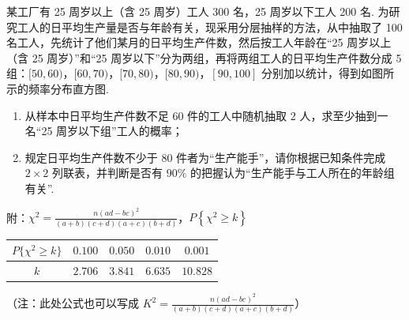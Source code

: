 \begin{problem}
某工厂有 25 周岁以上（含 25 周岁）工人 300 名，25 周岁以下工人 200 名. 为研究工人的日平均生产量是否与年龄有关，现采用分层抽样的方法，从中抽取了 100 名工人，先统计了他们某月的日平均生产件数，然后按工人年龄在“25 周岁以上（含 25 周岁）”和“25 周岁以下”分为两组，再将两组工人的日平均生产件数分成 5 组：\([50, 60)\)，\([60, 70)\)，\([70, 80)\)，\([80, 90)\)，\([90, 100]\) 分别加以统计，得到如图所示的频率分布直方图.

\begin{enumerate}
\item 从样本中日平均生产件数不足 60 件的工人中随机抽取 2 人，求至少抽到一名“25 周岁以下组”工人的概率；
\item 规定日平均生产件数不少于 80 件者为“生产能手”，请你根据已知条件完成 \(2\times 2\) 列联表，并判断是否有 \(90\%\) 的把握认为“生产能手与工人所在的年龄组有关”.
\end{enumerate}
附：\(\chi^2 = \frac{n(ad - bc)^2}{(a + b)(c + d)(a + c)(b + d)}\)，\(P\left\{\chi^{2} \geqslant k\right\}\)

\begin{center}
\begin{tabular}{c|cccc}
\(P\{\chi^2 \geqslant k\}\) & \(0.100\) & \(0.050\) & \(0.010\) & \(0.001\) \\
\hline
\(k\) & \(2.706\) & \(3.841\) & \(6.635\) & \(10.828\)
\end{tabular}
\end{center}

（注：此处公式也可以写成 \(K^2 = \frac{n(ad - bc)^2}{(a + b)(c + d)(a + c)(b + d)}\)）

\begingroup
\leftskip=0pt
\rightskip=0pt
\endgroup
\end{problem}


